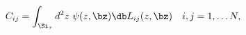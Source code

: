 \begin{equation}
C_{ij}=\int_{\Si_{\tau}} d^2z~ \psi(z,\bz) \db L_{ij}(z,\bz)
\quad i,j=1,\ldots N,
\label{Cas}
\end{equation}

